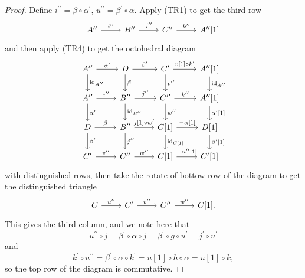 \documentclass[dissertation.tex]{subfiles}
\begin{document}
\begin{prop}
\begin{proof}
    Define $i^{\prime\prime} = \beta \circ \alpha^\prime$, $u^{\prime\prime} = \beta^\prime \circ \alpha$.
    Apply (TR1) to get the third row
    $$\begin{tikzcd}
      A^{\prime\prime} \arrow{r}{i^{\prime\prime}} & B^{\prime\prime} \arrow{r}{j^{\prime\prime}} & C^{\prime\prime} \arrow{r}{k^{\prime\prime}} & A^{\prime\prime}[1]
    \end{tikzcd}$$
    and then apply (TR4) to get the octohedral diagram
    $$\begin{tikzcd}
      A^{\prime\prime} \arrow{r}{\alpha^\prime}\arrow{d}{\id_{A^{\prime\prime}}} & D \arrow{r}{\beta^\prime}\arrow{d}{\beta} & C^\prime \arrow{r}{v[1] \circ k^\prime}\arrow{d}{v^{{\prime\prime}}} & A^{\prime\prime}[1]\arrow{d}{\id_{A^{\prime\prime}}}\\
      A^{\prime\prime} \arrow{r}{i^{\prime\prime}}\arrow{d}{\alpha^\prime} & B^{\prime\prime} \arrow{r}{j^{\prime\prime}}\arrow{d}{\id_{B^{\prime\prime}}} & C^{\prime\prime} \arrow{r}{k^{\prime\prime}}\arrow{d}{w^{\prime\prime}} & A^{\prime\prime}[1]\arrow{d}{\alpha^\prime[1]}\\
      D \arrow{r}{\beta}\arrow{d}{\beta^\prime} & B^{\prime\prime} \arrow{r}{j[1] \circ w^\prime}\arrow{d}{j^{\prime\prime}} & C[1] \arrow{r}{-\alpha[1]}\arrow{d}{\id_{C[1]}} & D[1]\arrow{d}{\beta^\prime[1]}\\
      C^\prime \arrow{r}{v^{\prime\prime}} & C^{\prime\prime} \arrow{r}{w^{\prime\prime}} & C[1] \arrow{r}{-u^{\prime\prime}[1]} & C^\prime[1]
    \end{tikzcd}$$
    with distinguished rows,
    then take the rotate of bottow row of the diagram to get the distinguished triangle
    $$\begin{tikzcd}
      C \arrow{r}{u^{\prime\prime}} & C^\prime \arrow{r}{v^{\prime\prime}} & C^{\prime\prime} \arrow{r}{w^{\prime\prime}} & C[1].
    \end{tikzcd}$$
    This gives the third column, and we note here that
    $$u^{\prime\prime} \circ j = \beta^\prime \circ \alpha \circ j = \beta^\prime \circ g \circ u^\prime = j^\prime \circ u^\prime$$
    and 
    $$k^\prime \circ u^{\prime\prime} = \beta^\prime \circ \alpha \circ k^\prime = u[1] \circ h \circ \alpha = u[1] \circ k,$$
    so the top row of the diagram is commutative.
    

\end{proof}
\end{prop}
\end{document}
